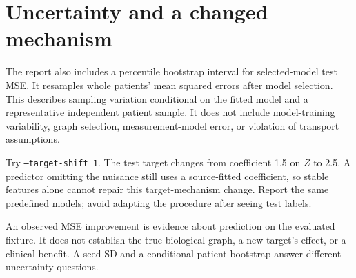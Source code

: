 \documentclass[11pt,oneside]{scrbook}
\begin{document}
\section{Uncertainty and a changed mechanism}
The report also includes a percentile bootstrap interval for selected-model test MSE.
It resamples whole patients' mean squared errors after model selection. This describes
sampling variation conditional on the fitted model and a representative independent
patient sample. It does not include model-training variability, graph selection,
measurement-model error, or violation of transport assumptions.

Try \texttt{--target-shift 1}. The test target changes from coefficient 1.5 on $Z$
to 2.5. A predictor omitting the nuisance still uses a source-fitted coefficient,
so stable features alone cannot repair this target-mechanism change. Report the
same predefined models; avoid adapting the procedure after seeing test labels.

\begin{pitfall}
An observed MSE improvement is evidence about prediction on the evaluated fixture.
It does not establish the true biological graph, a new target's effect, or a clinical
benefit. A seed SD and a conditional patient bootstrap answer different uncertainty questions.
\end{pitfall}
\end{document}

